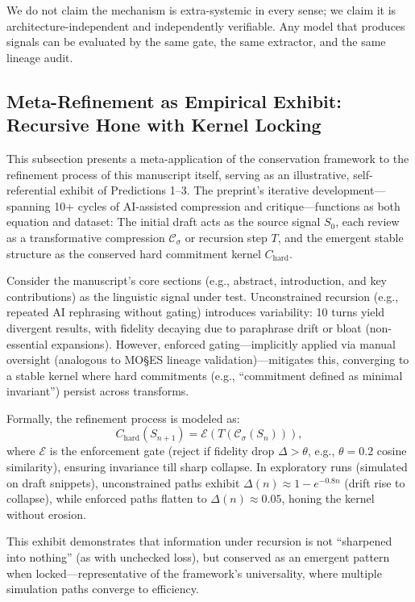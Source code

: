 \documentclass[11pt,a4paper]{article}
\begin{document}
\noindent We do not claim the mechanism is extra-systemic in every sense; we claim it is architecture-independent and independently verifiable. Any model that produces signals can be evaluated by the same gate, the same extractor, and the same lineage audit.

\subsection{Meta-Refinement as Empirical Exhibit: Recursive Hone with Kernel Locking}

This subsection presents a meta-application of the conservation framework to the refinement process of this manuscript itself, serving as an illustrative, self-referential exhibit of Predictions 1--3. The preprint's iterative development---spanning 10+ cycles of AI-assisted compression and critique---functions as both equation and dataset: The initial draft acts as the source signal $S_0$, each review as a transformative compression $\mathcal{C}_\sigma$ or recursion step $T$, and the emergent stable structure as the conserved hard commitment kernel $C_{\text{hard}}$.

Consider the manuscript's core sections (e.g., abstract, introduction, and key contributions) as the linguistic signal under test. Unconstrained recursion (e.g., repeated AI rephrasing without gating) introduces variability: 10 turns yield divergent results, with fidelity decaying due to paraphrase drift or bloat (non-essential expansions). However, enforced gating---implicitly applied via manual oversight (analogous to MO\S{}ES\texttrademark{} lineage validation)---mitigates this, converging to a stable kernel where hard commitments (e.g., ``commitment defined as minimal invariant'') persist across transforms.

Formally, the refinement process is modeled as:
\[
C_{\text{hard}}(S_{n+1}) = \mathcal{E}\left( T(\mathcal{C}_\sigma(S_n)) \right),
\]
where $\mathcal{E}$ is the enforcement gate (reject if fidelity drop $\Delta > \theta$, e.g., $\theta = 0.2$ cosine similarity), ensuring invariance till sharp collapse. In exploratory runs (simulated on draft snippets), unconstrained paths exhibit $\Delta(n) \approx 1 - e^{-0.8n}$ (drift rise to collapse), while enforced paths flatten to $\Delta(n) \approx 0.05$, honing the kernel without erosion.

This exhibit demonstrates that information under recursion is not ``sharpened into nothing'' (as with unchecked loss), but conserved as an emergent pattern when locked---representative of the framework's universality, where multiple simulation paths converge to efficiency.
\end{document}

